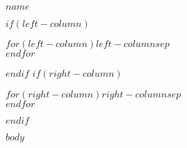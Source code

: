 \documentclass[$if(fontsize)$$fontsize$$else$10pt$endif$,letterpaper]{article}
\newcommand{\name}{$name$}
\begin{document}
{\huge \name}

  \bigskip

  $if(left-column)$
  \begin{minipage}[t]{0.495\textwidth}
    $for(left-column)$$left-column$$sep$ \\ $endfor$
  \end{minipage}
  $endif$
  $if(right-column)$
  \begin{minipage}[t]{0.495\textwidth}
    $for(right-column)$$right-column$$sep$ \\ $endfor$
  \end{minipage}
  $endif$

  $body$
\end{document}
